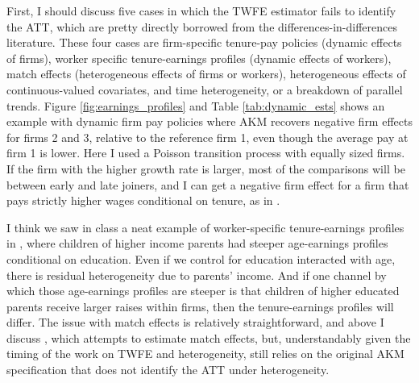 \documentclass{article}
\begin{document}
First, I should discuss five cases in which the TWFE estimator fails to identify the ATT, which are pretty directly borrowed from the differences-in-differences literature. These four cases are firm-specific tenure-pay policies (dynamic effects of firms), worker specific tenure-earnings profiles (dynamic effects of workers), match effects (heterogeneous effects of firms or workers), heterogeneous effects of continuous-valued covariates, and time heterogeneity, or a breakdown of parallel trends. Figure \ref{fig:earnings_profiles} and Table \ref{tab:dynamic_ests} shows an example with dynamic firm pay policies where AKM recovers negative firm effects for firms 2 and 3, relative to the reference firm 1, even though the average pay at firm 1 is lower. Here I used a Poisson transition process with equally sized firms. If the firm with the higher growth rate is larger, most of the comparisons will be between early and late joiners, and I can get a negative firm effect for a firm that pays strictly higher wages conditional on tenure, as in \citet{baker2022much}.

I think we saw in class a neat example of worker-specific tenure-earnings profiles in \citet{mello2022}, where children of higher income parents had steeper age-earnings profiles conditional on education. Even if we control for education interacted with age, there is residual heterogeneity due to parents' income. And if one channel by which those age-earnings profiles are steeper is that children of higher educated parents receive larger raises within firms, then the tenure-earnings profiles will differ. The issue with match effects is relatively straightforward, and above I discuss \citet{woodcock2015match}, which attempts to estimate match effects, but, understandably given the timing of the work on TWFE and heterogeneity, still relies on the original AKM specification that does not identify the ATT under heterogeneity.
\end{document}
